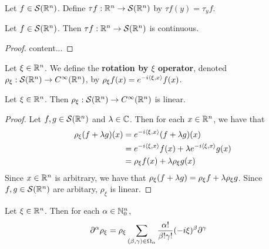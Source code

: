 \documentclass{book}
\begin{document}
	\begin{defn}
		Let $f \in \mathcal{S}(\mathbb{R}^n)$. Define $\tau f: \mathbb{R}^n \rightarrow \mathcal{S}(\mathbb{R}^n)$ by $\tau f(y) = \tau_y f$. 
	\end{defn}
	
	\begin{ex}
		Let $f \in \mathcal{S}(\mathbb{R}^n)$. Then $\tau f : \mathbb{R}^n \rightarrow \mathcal{S}(\mathbb{R}^n)$ is continuous.
	\end{ex}
	
	\begin{proof}
		content...
	\end{proof}


	\begin{defn}
		Let $\xi \in \mathbb{R}^n$. We define the \textbf{rotation by $\xi$ operator}, denoted $\rho_{\xi}: \mathcal{S}(\mathbb{R}^n) \rightarrow C^{\infty}(\mathbb{R}^n)$, by $\rho_{\xi}f(x) = e^{-i \langle \xi, x \rangle }f(x)$.
	\end{defn}

	\begin{ex}
		Let $\xi \in \mathbb{R}^n$. Then $\rho_{\xi}: \mathcal{S}(\mathbb{R}^n) \rightarrow C^{\infty}(\mathbb{R}^n)$ is linear.
	\end{ex}

	\begin{proof}
		Let $f, g \in \mathcal{S}(\mathbb{R}^n)$ and $\lambda \in \mathbb{C}$. Then for each $x \in \mathbb{R}^n$, we have that
		\begin{align*}
			\rho_{\xi}(f + \lambda g)(x) 
			& = e^{-i \langle \xi, x\rangle}(f+ \lambda g)(x) \\
			& = e^{-i \langle \xi, x\rangle}f(x) + \lambda e^{-i \langle \xi, x\rangle} g(x) \\
			& = \rho_{\xi}f (x) + \lambda \rho_{\xi} g(x)
		\end{align*}
		Since $x \in \mathbb{R}^n$ is arbitrary, we have that $\rho_{\xi} (f + \lambda g) = \rho_{\xi} f + \lambda \rho_{\xi} g$. Since $f, g \in \mathcal{S}(\mathbb{R}^n)$ are arbitary, $\rho_{\xi}$ is linear. 
	\end{proof}

	\begin{ex}
		Let $\xi \in \mathbb{R}^n$. Then for each $\alpha \in \mathbb{N}_0^n$,  
		\begin{align*}
			\partial^{\alpha} \rho_{\xi}
			& =   \rho_{\xi}  \sum_{(\beta, \gamma) \in \Omega_{\alpha}} \frac{\alpha!}{\beta! \gamma!} (-i \xi)^{\beta}  \partial^{\gamma} 
		\end{align*}
	\end{ex}
	
\end{document}
